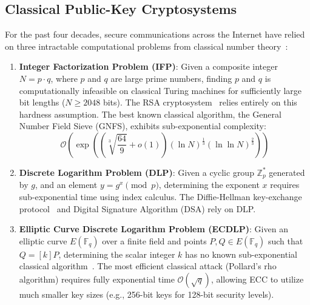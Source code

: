 \subsection{Classical Public-Key Cryptosystems}
For the past four decades, secure communications across the Internet have relied on three intractable computational problems from classical number theory~\cite{menezes1996handbook,stallings2022cryptography}:
\begin{enumerate}
    \item \textbf{Integer Factorization Problem (IFP)}: Given a composite integer $N = p \cdot q$, where $p$ and $q$ are large prime numbers, finding $p$ and $q$ is computationally infeasible on classical Turing machines for sufficiently large bit lengths ($N \ge 2048$ bits). The RSA cryptosystem~\cite{rivest1978method} relies entirely on this hardness assumption. The best known classical algorithm, the General Number Field Sieve (GNFS), exhibits sub-exponential complexity:
    \begin{equation}
    \mathcal{O}\left(\exp\left(\left(\sqrt[3]{\frac{64}{9}} + o(1)\right) (\ln N)^{\frac{1}{3}} (\ln \ln N)^{\frac{2}{3}}\right)\right)
    \end{equation}
    \item \textbf{Discrete Logarithm Problem (DLP)}: Given a cyclic group $\mathbb{Z}_p^*$ generated by $g$, and an element $y = g^x \pmod p$, determining the exponent $x$ requires sub-exponential time using index calculus. The Diffie-Hellman key-exchange protocol~\cite{diffie1976new} and Digital Signature Algorithm (DSA) rely on DLP.
    \item \textbf{Elliptic Curve Discrete Logarithm Problem (ECDLP)}: Given an elliptic curve $E(\mathbb{F}_q)$ over a finite field and points $P, Q \in E(\mathbb{F}_q)$ such that $Q = [k]P$, determining the scalar integer $k$ has no known sub-exponential classical algorithm~\cite{koblitz1987elliptic}. The most efficient classical attack (Pollard's rho algorithm) requires fully exponential time $\mathcal{O}(\sqrt{q})$, allowing ECC to utilize much smaller key sizes (e.g., 256-bit keys for 128-bit security levels).
\end{enumerate}

